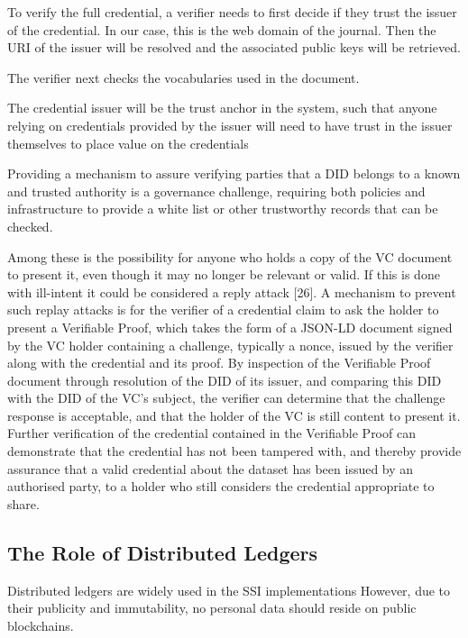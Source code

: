 To verify the full credential, a verifier needs to first decide if they trust the issuer of the credential. In our case, this is the web domain of the journal. Then the \acrshort{URI} of the issuer will be resolved and the associated public keys will be retrieved. 

The verifier next checks the vocabularies used in the document. 

The credential issuer will be the trust anchor in the system,
such that anyone relying on credentials provided by the issuer
will need to have trust in the issuer themselves to place value
on the credentials \parencite{linn2000trust}

Providing a mechanism to assure verifying parties that a
DID belongs to a known and trusted authority is a governance
challenge, requiring both policies and infrastructure to provide
a white list or other trustworthy records that can be checked.

 Among these is the
possibility for anyone who holds a copy of the VC document
to present it, even though it may no longer be relevant or
valid. If this is done with ill-intent it could be considered
a reply attack [26]. A mechanism to prevent such replay
attacks is for the verifier of a credential claim to ask the
holder to present a Verifiable Proof, which takes the form of
a JSON-LD document signed by the VC holder containing a
challenge, typically a nonce, issued by the verifier along with
the credential and its proof. By inspection of the Verifiable
Proof document through resolution of the DID of its issuer,
and comparing this DID with the DID of the VC’s subject,
the verifier can determine that the challenge response is
acceptable, and that the holder of the VC is still content to
present it. Further verification of the credential contained in
the Verifiable Proof can demonstrate that the credential has not
been tampered with, and thereby provide assurance that a valid
credential about the dataset has been issued by an authorised
party, to a holder who still considers the credential appropriate
to share.




\subsection{The Role of Distributed Ledgers}

Distributed ledgers are widely used in the \acrshort{SSI} implementations 
However, due to their publicity and immutability, no personal data should reside on public blockchains. 

